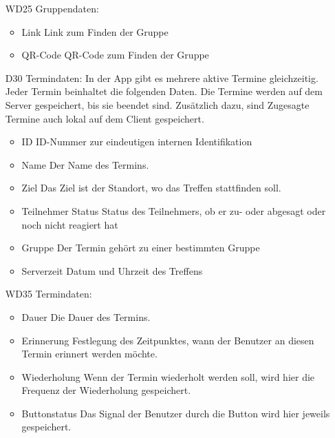 \documentclass{scrartcl}
\begin{document}
\begin{itemize}
		
		\item [WD25] Gruppendaten:
		\begin{itemize}
			\item Link
			\newline Link zum Finden der Gruppe
			\item QR-Code
			\newline QR-Code zum Finden der Gruppe
		\end{itemize}
		
		\item [D30] Termindaten:
		\newline In der App gibt es mehrere aktive Termine gleichzeitig. Jeder Termin beinhaltet die folgenden Daten.
		Die Termine werden auf dem Server gespeichert, bis sie beendet sind. Zusätzlich dazu, sind Zugesagte Termine auch lokal auf dem Client gespeichert.
		\begin{itemize}
			\item ID
			\newline ID-Nummer zur eindeutigen internen Identifikation
			\item Name
			\newline Der Name des Termins.
			\item Ziel
			\newline Das Ziel ist der Standort, wo das Treffen stattfinden soll.
			\item \gls{Teilnehmer} Status
			\newline Status des Teilnehmers, ob er zu- oder abgesagt oder noch nicht reagiert hat
			\item Gruppe
			\newline Der Termin gehört zu einer bestimmten Gruppe
			\item Serverzeit
			\newline Datum und Uhrzeit des Treffens
		\end{itemize}
		
		\item [WD35] Termindaten:
	 	\begin{itemize}
			\item Dauer
			\newline Die Dauer des Termins.
			\item Erinnerung
			\newline Festlegung des Zeitpunktes, wann der Benutzer an diesen Termin erinnert werden möchte.
			\item Wiederholung
			\newline Wenn der Termin wiederholt werden soll, wird hier die Frequenz der Wiederholung gespeichert.
			\item Buttonstatus 
			\newline Das Signal der Benutzer durch die Button wird hier jeweils gespeichert.
		\end{itemize}
	\end{itemize}
	
\end{document}

